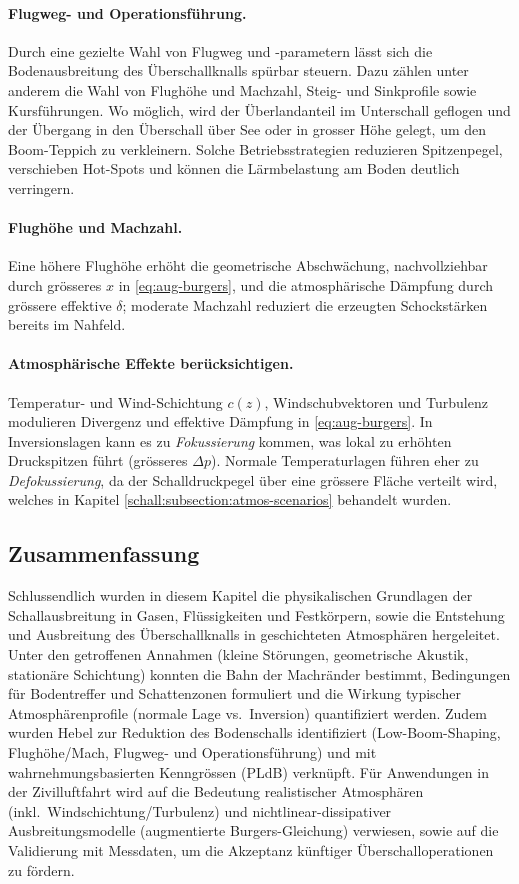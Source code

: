 \paragraph{Flugweg- und Operationsführung.}
Durch eine gezielte Wahl von Flugweg und -parametern lässt sich die
Bodenausbreitung des Überschallknalls spürbar steuern.
Dazu zählen unter anderem die Wahl von Flughöhe und Machzahl, Steig-
und Sinkprofile sowie Kursführungen.
Wo möglich, wird der Überlandanteil im Unterschall geflogen und der
Übergang in den Überschall über See oder in grosser Höhe gelegt,
um den Boom-Teppich zu verkleinern.
Solche Betriebsstrategien reduzieren Spitzenpegel, verschieben Hot-Spots
und können die Lärmbelastung am Boden deutlich verringern.

\paragraph{Flughöhe und Machzahl.}
Eine höhere Flughöhe erhöht die geometrische Abschwächung, nachvollziehbar durch
grösseres $x$ in \eqref{eq:aug-burgers}, und die atmosphärische Dämpfung durch
grössere effektive $\delta$; moderate Machzahl reduziert die erzeugten
Schockstärken bereits im Nahfeld.

\paragraph{Atmosphärische Effekte berücksichtigen.}
Temperatur- und Wind-Schichtung $c(z)$, Windschubvektoren und Turbulenz
modulieren Divergenz und effektive Dämpfung in \eqref{eq:aug-burgers}.
In Inversionslagen kann es zu \emph{Fokussierung} kommen, was lokal
zu erhöhten Druckspitzen führt (grösseres $\Delta p$).
Normale Temperaturlagen führen eher zu \emph{Defokussierung},
da der Schalldruckpegel über eine grössere Fläche verteilt wird,
welches in Kapitel \ref{schall:subsection:atmos-scenarios} behandelt wurden.

\subsection*{Zusammenfassung}
Schlussendlich wurden in diesem Kapitel die physikalischen Grundlagen der
Schallausbreitung in Gasen, Flüssigkeiten und Festkörpern, sowie die
Entstehung und Ausbreitung des Überschallknalls in geschichteten
Atmosphären hergeleitet.
Unter den getroffenen Annahmen (kleine Störungen, geometrische Akustik,
stationäre Schichtung) konnten die Bahn der Machränder bestimmt,
Bedingungen für Bodentreffer und Schattenzonen formuliert und die Wirkung
typischer Atmosphärenprofile (normale Lage vs.\ Inversion) quantifiziert werden.
Zudem wurden Hebel zur Reduktion des Bodenschalls identifiziert
(Low-Boom-Shaping, Flughöhe/Mach, Flugweg- und Operationsführung) und mit
wahrnehmungsbasierten Kenngrössen (PLdB) verknüpft.
Für Anwendungen in der Zivilluftfahrt wird auf die Bedeutung
realistischer Atmosphären (inkl.\ Windschichtung/Turbulenz) und
nichtlinear-dissipativer Ausbreitungsmodelle
(augmentierte Burgers-Gleichung) verwiesen,
sowie auf die Validierung mit Messdaten, um die Akzeptanz künftiger
Überschalloperationen zu fördern.